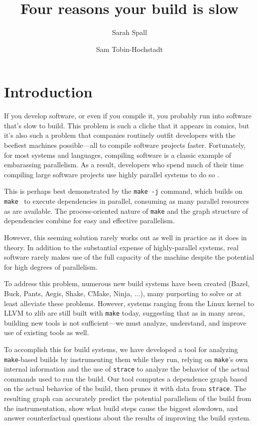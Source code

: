 \documentclass[sigconf,10pt,authorversion]{acmart}\settopmatter{printfolios=true,printccs=false,printacmref=false}
\title{Four reasons your build is slow}
\author{Sarah Spall}
\affiliation{Indiana University}
\author{Sam Tobin-Hochstadt}
\affiliation{Indiana University}
\begin{document}
\maketitle

\section{Introduction}

If you develop software, or even if you compile it, you probably run
into software that's slow to build. This problem is such a cliche that
it appears in comics, but it's also such a problem that companies
routinely outfit developers with the beefiest machines possible---all
to compile software projects faster. Fortunately, for most systems and
languages, compiling software is a classic example of embarassing
parallelism. As a result, developers who spend much of their time
compiling large software projects use highly parallel systems to do so
\cite{regehr-tweet}.

This is perhaps best demonstrated by the  \verb|make -j|
command, which builds on \verb|make|~\cite{make} to execute
dependencies in parallel, consuming as many parallel resources as are
available. The process-oriented nature of \verb|make| and the graph
structure of dependencies combine for easy and effective parallelism.

However, this seeming solution rarely works out as well in practice as
it does in theory. In addition to the substantial expense of
highly-parallel systems, real software rarely makes use of the full
capacity of the machine despite the potential for high
degrees of parallelism.

To address this problem, numerous new build systems have been created
(Bazel, Buck, Pants, Aegis, Shake, CMake, Ninja, ...), many purporting
to solve or at least alleviate these problems. However, systems
 ranging from the Linux kernel to LLVM to zlib are still built
with \verb|make| today, suggesting that as in many areas, building new
tools is not sufficient---we must analyze, understand, and improve use
of existing tools as well.

To accomplish this for build systems, we have developed a tool for
analyzing \verb|make|-based builds by instrumenting them while they
run, relying on \verb|make|'s own internal information and the use of
\verb|strace| to analyze the behavior of the actual commands used to
run the build. Our tool computes a dependence graph based on the
actual behavior of the build, then prunes it with data from
\verb|strace|. The resulting graph can accurately predict the
potential parallelism of the build from the instrumentation, show what
build steps cause the biggest slowdown, and answer counterfactual
questions about the results of improving the build system.
\end{document}

